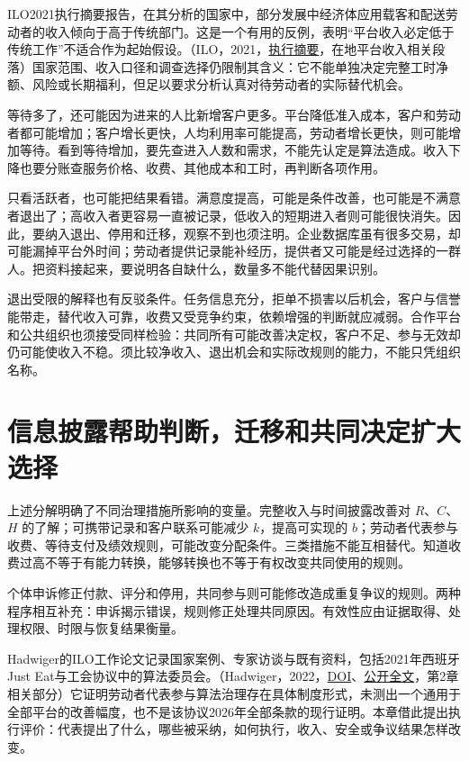 \documentclass[UTF8,fontset=windows,12pt,a4paper,oneside,openany]{ctexbook}
\begin{document}
ILO2021执行摘要报告，在其分析的国家中，部分发展中经济体应用载客和配送劳动者的收入倾向于高于传统部门。这是一个有用的反例，表明“平台收入必定低于传统工作”不适合作为起始假设。（ILO，2021，\href{https://www.ilo.org/sites/default/files/wcmsp5/groups/public/@dgreports/@dcomm/documents/publication/wcms_771672.pdf}{执行摘要}，在地平台收入相关段落）国家范围、收入口径和调查选择仍限制其含义：它不能单独决定完整工时净额、风险或长期福利，但足以要求分析认真对待劳动者的实际替代机会。

等待多了，还可能因为进来的人比新增客户更多。平台降低准入成本，客户和劳动者都可能增加；客户增长更快，人均利用率可能提高，劳动者增长更快，则可能增加等待。看到等待增加，要先查进入人数和需求，不能先认定是算法造成。收入下降也要分账查服务价格、收费、其他成本和工时，再判断各项作用。

只看活跃者，也可能把结果看错。满意度提高，可能是条件改善，也可能是不满意者退出了；高收入者更容易一直被记录，低收入的短期进入者则可能很快消失。因此，要纳入退出、停用和迁移，观察不到也须注明。企业数据库虽有很多交易，却可能漏掉平台外时间；劳动者提供记录能补经历，提供者又可能是经过选择的一群人。把资料接起来，要说明各自缺什么，数量多不能代替因果识别。

退出受限的解释也有反驳条件。任务信息充分，拒单不损害以后机会，客户与信誉能带走，替代收入可靠，收费又受竞争约束，依赖增强的判断就应减弱。合作平台和公共组织也须接受同样检验：共同所有可能改善决定权，客户不足、参与无效却仍可能使收入不稳。须比较净收入、退出机会和实际改规则的能力，不能只凭组织名称。

\section{信息披露帮助判断，迁移和共同决定扩大选择}

上述分解明确了不同治理措施所影响的变量。完整收入与时间披露改善对 $R$、$C$、$H$ 的了解；可携带记录和客户联系可能减少 $k$，提高可实现的 $b$；劳动者代表参与收费、等待支付及绩效规则，可能改变分配条件。三类措施不能互相替代。知道收费过高不等于有能力转换，能够转换也不等于有权改变共同使用的规则。

个体申诉修正付款、评分和停用，共同参与则可能修改造成重复争议的规则。两种程序相互补充：申诉揭示错误，规则修正处理共同原因。有效性应由证据取得、处理权限、时限与恢复结果衡量。

Hadwiger的ILO工作论文记录国家案例、专家访谈与既有资料，包括2021年西班牙Just Eat与工会协议中的算法委员会。（Hadwiger，2022，\href{https://doi.org/10.54394/VARD7939}{DOI}、\href{https://webapps.ilo.org/static/english/intserv/working-papers/wp080/index.html}{公开全文}，第2章相关部分）它证明劳动者代表参与算法治理存在具体制度形式，未测出一个通用于全部平台的改善幅度，也不是该协议2026年全部条款的现行证明。本章借此提出执行评价：代表提出了什么，哪些被采纳，如何执行，收入、安全或争议结果怎样改变。
\end{document}
